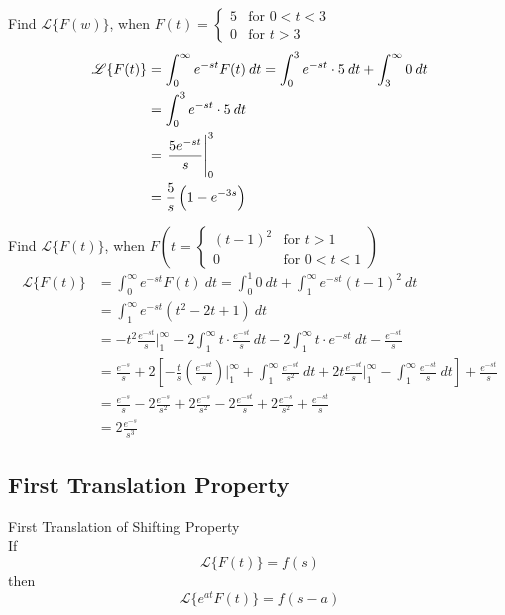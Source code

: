 \documentclass[12pt]{article}
\newcommand{\Lap}{\mathscr{L}}
\begin{document}
\begin{example}{Find $\Lap \{ F(w) \}$, when \(F(t) =
    \begin{cases}
        5 & \text{for } 0 < t < 3 \\
        0 & \text{for } t > 3
    \end{cases}\)}{}
    \begin{align*}
        \Lap \{ F(t) \} &= \int_{0}^{\infty} {e^{-st}F(t)} \: d{t}
        = \int_{0}^{3} {e^{-st} \cdot 5} \: d{t} + \int_{3}^{\infty} {0} \: d{t} \\
        &= \int_{0}^{3} {e^{-st} \cdot 5} \: d{t} \\
        &= \eval{ \frac{5e^{-st}}{s} }_{0}^{3} \\
        &= \frac{5}{s} \left( 1 - e^{-3s} \right)
    \end{align*}
\end{example}

\begin{example}{Find $\Lap \{ F(t) \}$, when \(F(t =
    \begin{cases}
        (t-1)^2 & \text{for } t > 1 \\
        0 & \text{for } 0 < t < 1
    \end{cases})\)}{}
    \begin{align*}
        \Lap \{ F(t) \} &= \int_{0}^{\infty} {e^{-s t}F(t)} \: d{t}
        = \int_{0}^{1} {0} \: d{t} + \int_{1}^{\infty} {e^{-s t}(t-1)^2} \: d{t} \\
        &= \int_{1}^{\infty} {e^{-s t}(t^2 -2t + 1)} \: d{t}  \\
        &= { - t^2 \frac{e^{-s t}}{s}\bigg|_1^\infty } - 2 \int_{1}^{\infty} { t \cdot \frac{e^{-s t}}{s} } \: d{t} - 2 \int_{1}^{\infty} { t \cdot e^{-s t} } \: d{t} - \frac{e^{-s t}}{s} \\
        &= \frac{e^{-s}}{s} + 2 \left[ -\frac{t}{s} \left( \frac{e^{-s t}}{s} \right) \bigg|_1^\infty + \int_{1}^{\infty} { \frac{e^{-s t}}{s^2} } \: d{t} + 2 t \frac{e^{-s t}}{s}\bigg|_1^\infty - \int_{1}^{\infty} {\frac{e^{-s t}}{s}} \: d{t}\right] + \frac{e^{-s t}}{s} \\
        &= \frac{e^{-s}}{s} - 2 \frac{e^{-s}}{s^2} + 2 \frac{e^{-s}}{s^2} - 2 \frac{e^{-s t}}{s} + 2 \frac{e^{-s}}{s^2} + \frac{e^{-s t}}{s} \\
        &= 2 \frac{e^{-s}}{s^3}
    \end{align*}
\end{example}

\subsection{First Translation Property}
\begin{theorem}{First Translation of Shifting Property}{}
    \\If \[
        \Lap \{ F(t) \} = f(s)
    \] then
    \[ \Lap \{ e^{at}F(t) \} = f(s-a) \]
\end{theorem}
\end{document}

